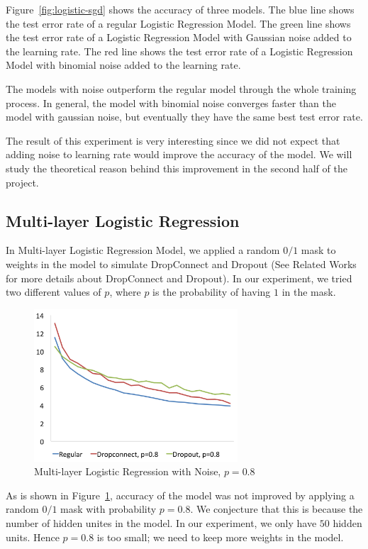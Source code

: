 Figure~\ref{fig:logistic-sgd} shows the accuracy of three models.
The blue line shows the test error rate of a regular Logistic Regression
Model.  The green line shows the test error rate of a Logistic Regression
Model with Gaussian noise added to the learning rate.  The red line shows
the test error rate of a Logistic Regression Model with binomial noise
added to the learning rate.

The models with noise outperform the regular model through the whole
training process.  In general, the model with binomial noise converges
faster than the model with gaussian noise, but eventually they have the
same best test error rate.

The result of this experiment is very interesting since we did not
expect that adding noise to learning rate would improve the accuracy
of the model. We will study the theoretical reason behind this improvement
in the second half of the project.

\subsection{Multi-layer Logistic Regression}
In Multi-layer Logistic Regression Model, we applied a random $0/1$ mask to
weights in the model to simulate DropConnect and Dropout
(See Related Works for more details about DropConnect and Dropout).
In our experiment, we tried two different values of $p$, where $p$ is
the probability of having $1$ in the mask.

\begin{figure}[h]
\centering
\includegraphics[width=215pt]{figs/mlp_psmall.png}
\caption{Multi-layer Logistic Regression with Noise, $p=0.8$}
\label{fig:mlp-noise-psmall}
\end{figure}

As is shown in Figure~\ref{fig:mlp-noise-psmall}, accuracy of the model was not
improved by applying a random $0/1$ mask with probability $p=0.8$.
We conjecture that this is because the number of hidden unites in the
model. In our experiment, we only have $50$ hidden units. Hence $p=0.8$ is
too small; we need to keep more weights in the model.


